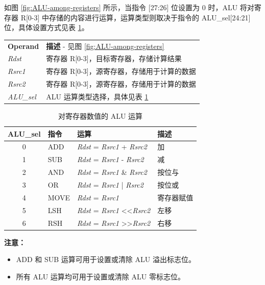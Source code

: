 \documentclass[main\_\_CN.tex]{subfiles}
\begin{document}
如图 \ref{fig:ALU-among-registers} 所示，当指令 [27:26] 位设置为 0 时，ALU 将对寄存器 R[0-3] 中存储的内容进行运算，运算类型则取决于指令的 ALU\_sel[24:21] 位，具体设置方式见表 \ref{tab:ALU-among-registers}。

\begin{tabular}{ l l }
\textbf{Operand} & \textbf{描述} - 见图 \ref{fig:ALU-among-registers} \\
\textit{Rdst} & 寄存器 R[0-3]，目标寄存器，存储计算结果\\
\textit{Rsrc1} & 寄存器 R[0-3]，源寄存器，存储用于计算的数据 \\
\textit{Rsrc2} & 寄存器 R[0-3]，源寄存器，存储用于计算的数据 \\
\textit{ALU\_sel} & ALU 运算类型选择，具体见表 \ref{tab:ALU-among-registers}\\
\end{tabular}

\begin{table}[H]
    \centering
    \begin{tabular}{ c l l l }
    \textbf{ALU\_sel} & \textbf{指令} & \textbf{运算} & \textbf{描述} \\ \hline
    0 & ADD & \textit{Rdst} = \textit{Rsrc1} + \textit{Rsrc2} & 加 \\
    1 & SUB & \textit{Rdst} = \textit{Rsrc1} - \textit{Rsrc2} & 减 \\
    2 & AND & \textit{Rdst} = \textit{Rsrc1} \& \textit{Rsrc2} & 按位与 \\
    3 & OR & \textit{Rdst} = \textit{Rsrc1} | \textit{Rsrc2} & 按位或 \\
    4 & MOVE & \textit{Rdst} = \textit{Rsrc1} & 寄存器赋值 \\
    5 & LSH & \textit{Rdst} = \textit{Rsrc1} \textless\textless\textvisiblespace \textit{Rsrc2} & 左移 \\
    6 & RSH & \textit{Rdst} = \textit{Rsrc1} \textgreater\textgreater\textvisiblespace \textit{Rsrc2} & 右移 \\
    \end{tabular}
    \caption{对寄存器数值的 ALU 运算}
    \label{tab:ALU-among-registers}
\end{table}
\vspace{-2em}
\textbf{注意：}
\begin{itemize}
    \item ADD 和 SUB 运算可用于设置或清除 ALU 溢出标志位。
    \item 所有 ALU 运算均可用于设置或清除 ALU 零标志位。
\end{itemize}
\end{document}
